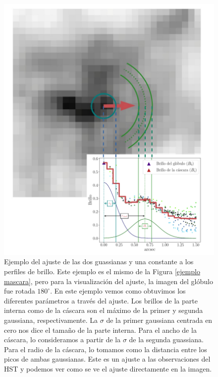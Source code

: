 \documentclass{book}
\begin{document}
\begin{figure}[htbp]
    \centering
    \includegraphics[width=\textwidth]{imagenes_corregidas/Ejemplo_ajuste_final.pdf}
    \caption{Ejemplo del ajuste de las dos guassianas y una constante
      a los perfiles de brillo. Este ejemplo es el mismo de la Figura
      \ref{ejemplo mascara}, pero para la visualización del ajuste, la
      imagen del glóbulo fue rotada $180^\circ$. En este ejemplo vemos
      como obtuvimos los diferentes parámetros a través del ajuste.
      Los brillos de la parte interna como de la cáscara son el máximo
      de la primer y segunda gaussiana, respectivamente. La $\sigma$ de la
      primer gaussiana centrada en cero nos dice el tamaño de la parte
      interna. Para el ancho de la cáscara, lo consideramos a partir
      de la $\sigma$ de la segunda guassiana. Para el radio de la cáscara,
      lo tomamos como la distancia entre los picos de ambas
      gaussianas. Este es un ajuste a las observaciones del HST y
      podemos ver como se ve el ajuste directamente en la imagen.}
    \label{ejemplo ajuste}
\end{figure}
\end{document}
